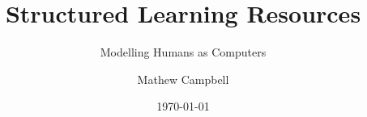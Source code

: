\documentclass[a4paper]{report}
\title{Structured Learning Resources}
\subtitle{Modelling Humans as Computers}
\author{Mathew Campbell}
\date{\today}
\begin{document}
  \makeTYPTitle

  

  \tableofcontents
  \listoffigures
  \listoftables

  
  
  
  
  
  
  

  

  
\end{document}
